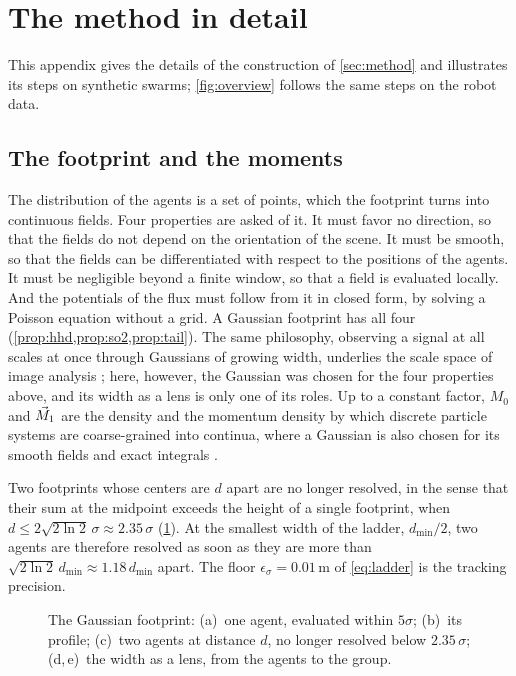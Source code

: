 \section{The method in detail}
\label{app:method}

This appendix gives the details of the construction of \cref{sec:method} and illustrates its steps on synthetic swarms;
\cref{fig:overview} follows the same steps on the robot data.

\subsection{The footprint and the moments}

The distribution of the agents is a set of points, which the footprint turns into continuous fields. Four properties
are asked of it. It must favor no direction, so that the fields do not depend on the orientation of the scene. It must
be smooth, so that the fields can be differentiated with respect to the positions of the agents. It must be negligible
beyond a finite window, so that a field is evaluated locally. And the potentials of the flux must follow from it in
closed form, by solving a Poisson equation without a grid. A Gaussian footprint has all four
(\cref{prop:hhd,prop:so2,prop:tail}). The same philosophy, observing a signal at all scales at once through Gaussians of
growing width, underlies the scale space of image analysis \citep{witkin1983scale,lindeberg1994scale}; here, however,
the Gaussian was chosen for the four properties above, and its width as a lens is only one of its roles. Up to a
constant factor, $M_0$ and $\vec{M}_1$ are the density and the momentum density by which discrete particle systems are
coarse-grained into continua, where a Gaussian is also chosen for its smooth fields and exact integrals
\citep{weinhart2012discrete}.

Two footprints whose centers are $d$ apart are no longer resolved, in the sense that their sum at the midpoint exceeds
the height of a single footprint, when $d\le2\sqrt{2\ln2}\,\sigma\approx2.35\,\sigma$ (\cref{fig:footprint}). At the
smallest width of the ladder, $d_{\min}/2$, two agents are therefore resolved as soon as they are more than
$\sqrt{2\ln2}\,d_{\min}\approx1.18\,d_{\min}$ apart. The floor $\epsilon_\sigma=0.01$\,m of \eqref{eq:ladder} is the
tracking precision.

\begin{figure}[!htbp]
\centering
{}
\caption{The Gaussian footprint: (a)~one agent, evaluated within $5\sigma$; (b)~its profile; (c)~two agents at
distance $d$, no longer resolved below $2.35\,\sigma$; (d,\,e)~the width as a lens, from the agents to the group.}
\label{fig:footprint}
\end{figure}
\FloatBarrier

